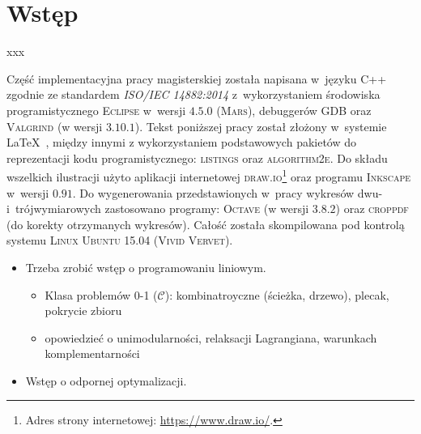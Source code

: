 \chapter{Wstęp}
\thispagestyle{chapterBeginStyle}

xxx

Część implementacyjna pracy magisterskiej została napisana w~języku \textsf{C++} zgodnie ze standardem \textit{\textsc{ISO/IEC 14882:2014}} z~wykorzystaniem środowiska programistycznego \textsc{Eclipse} w~wersji \textsc{$4.5.0$} (\textsc{Mars}), debuggerów \textsc{GDB} oraz \textsc{Valgrind} (w wersji \textsc{$3.10.1$}).
Tekst poniższej pracy został złożony w~systemie \LaTeX~, między innymi z wykorzystaniem podstawowych pakietów do reprezentacji kodu programistycznego: \textsc{listings} oraz \textsc{algorithm2e}.
Do składu wszelkich ilustracji użyto aplikacji internetowej \textsc{draw.io}\footnote{
	Adres strony internetowej: \url{https://www.draw.io/}.
} oraz programu \textsc{Inkscape} w~wersji \textsc{$0.91$}.
Do wygenerowania przedstawionych w~pracy wykresów dwu- i~trójwymiarowych zastosowano programy: \textsc{Octave} (w wersji \textsc{$3.8.2$}) oraz \textsc{croppdf} (do korekty otrzymanych wykresów).
Całość została skompilowana pod kontrolą systemu \textsc{Linux Ubuntu 15.04 (Vivid Vervet)}.

\begin{itemize}
	\item Trzeba zrobić wstęp o programowaniu liniowym.
	\begin{itemize}
		\item Klasa problemów 0-1 ($\mathscr{C}$): kombinatroyczne (ścieżka, drzewo), plecak, pokrycie zbioru
		\item opowiedzieć o unimodularności, relaksacji Lagrangiana, warunkach komplementarności
	\end{itemize}
	\item Wstęp o odpornej optymalizacji.
\end{itemize}
